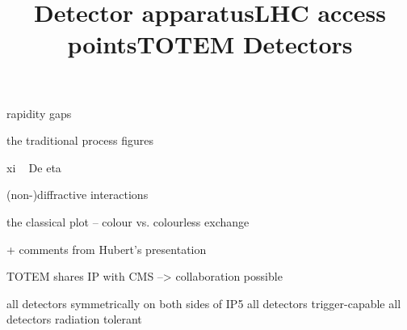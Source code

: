 \> rapidity gaps

\> the traditional process figures

\> xi ~ De eta


\newpage %
\title{}


\newpage %
\title{}

(non-)diffractive interactions

the classical plot -- colour vs. colourless exchange 

\newpage %
\title{}


+ comments from Hubert's presentation

\newpage %
\title{}


\newpage %
\hbox{}
\vfil
\title{Detector apparatus}


\newpage %
\title{LHC access points}


\> TOTEM shares IP with CMS --> collaboration possible

\newpage %
\title{TOTEM Detectors}

\vfil


\> all detectors symmetrically on both sides of IP5
\> all detectors trigger-capable
\> all detectors radiation tolerant

